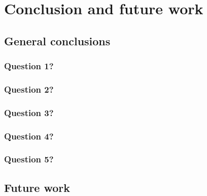 \chapter{Conclusion and future work}
\label{ch:conclusion}

\section{General conclusions}

    \subsection{Question 1?}
    
    \subsection{Question 2?}
    
    \subsection{Question 3?}
    
    \subsection{Question 4?}
    
    \subsection{Question 5?}



\section{Future work}